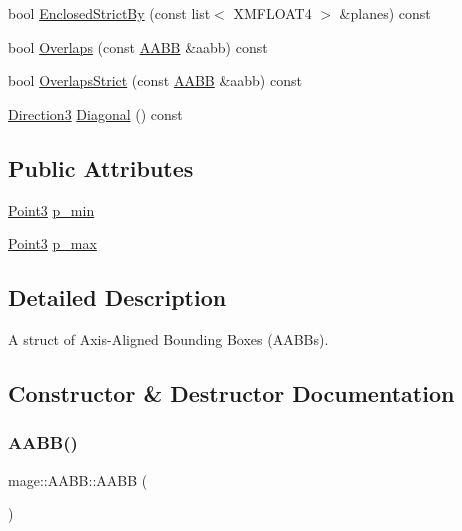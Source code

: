 \begin{DoxyCompactItemize}
\item 
bool \hyperlink{structmage_1_1_a_a_b_b_a098cdfecc66ce8a1e557280aafda33e3}{Enclosed\+Strict\+By} (const list$<$ X\+M\+F\+L\+O\+A\+T4 $>$ \&planes) const
\item 
bool \hyperlink{structmage_1_1_a_a_b_b_a5a959edc3bc5ccdd29025d612c2e66e3}{Overlaps} (const \hyperlink{structmage_1_1_a_a_b_b}{A\+A\+BB} \&aabb) const
\item 
bool \hyperlink{structmage_1_1_a_a_b_b_ae8e6eca9c5e30015a91ab2e900594bfc}{Overlaps\+Strict} (const \hyperlink{structmage_1_1_a_a_b_b}{A\+A\+BB} \&aabb) const
\item 
\hyperlink{structmage_1_1_direction3}{Direction3} \hyperlink{structmage_1_1_a_a_b_b_a2f63dfb4e4296101897a5a3e2b8ad4bb}{Diagonal} () const
\end{DoxyCompactItemize}
\subsection*{Public Attributes}
\begin{DoxyCompactItemize}
\item 
\hyperlink{structmage_1_1_point3}{Point3} \hyperlink{structmage_1_1_a_a_b_b_a600c62081fd3516c0be64bb81495cd1d}{p\+\_\+min}
\item 
\hyperlink{structmage_1_1_point3}{Point3} \hyperlink{structmage_1_1_a_a_b_b_ad0a69206176c61ce9a71f2ddb0e5deb2}{p\+\_\+max}
\end{DoxyCompactItemize}


\subsection{Detailed Description}
A struct of Axis-\/\+Aligned Bounding Boxes (A\+A\+B\+Bs). 

\subsection{Constructor \& Destructor Documentation}
\hypertarget{structmage_1_1_a_a_b_b_ae6db94dcb9165eb008f0be8741f0eb62}{}\label{structmage_1_1_a_a_b_b_ae6db94dcb9165eb008f0be8741f0eb62} 
\subsubsection{\texorpdfstring{A\+A\+B\+B()}{AABB()}\hspace{0.1cm}{\footnotesize\ttfamily [1/2]}}
{\footnotesize\ttfamily mage\+::\+A\+A\+B\+B\+::\+A\+A\+BB (\begin{DoxyParamCaption}{ }\end{DoxyParamCaption})}

